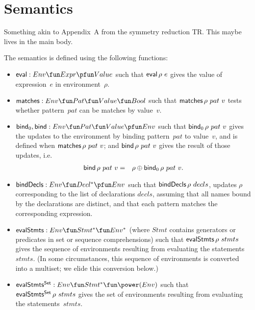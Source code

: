 \section{Semantics}
\label{sec:semantics}

Something akin to Appendix~A from the symmetry reduction TR.  This maybe lives
in the main body. 

The semantics is defined using the following functions:
%
\begin{itemize}
\item $\eval : Env \fun Expr \pfun Value$ such that $\mathop{\sf eval} \rho~e$ gives the
  value of expression~$e$ in environment~$\rho$.

\item $\matches : Env \fun Pat \fun Value \fun Bool$ such that
  $\mathop{\sf matches} \rho~pat ~ v$ tests whether pattern~$pat$ can be matches by
  value~$v$.

\item $\bind_0, \bind : Env \fun Pat \fun Value \pfun Env$ such that
  $\mathop{\sf bind}\nolimits_0 \rho~pat~v$ gives the updates to the environment by binding
  pattern~$pat$ to value~$v$, and is defined when $\mathop{\sf matches} \rho~ pat~v$; and 
  $\mathop{\sf bind}\nolimits \rho~pat~v$ gives the result of those updates, i.e.
  \begin{eqnarray*}
  \mathop{\sf bind}\nolimits \rho~pat~v & = & \rho \oplus \mathop{\sf bind}\nolimits_0 \rho~pat~v.
  \end{eqnarray*}

\item $\bindDecls : Env \fun Decl^* \pfun Env$ such that
  $\mathop{\sf bindDecls} \rho~decls$, updates $\rho$ corresponding to the list of
  declarations $decls$, assuming that all names bound by the declarations are
  distinct, and that each pattern matches the corresponding expression.

\item $\evalStmts : Env \fun Stmt^* \fun Env^*$ (where $Stmt$ contains
  generators or predicates in set or sequence comprehensions) such that
  $\mathop{\sf evalStmts} \rho~stmts$ gives the sequence of environments resulting from
  evaluating the statements~$stmts$.  (In some circumstances, this sequence of
  environments is converted into a multiset; we elide this conversion
  below.)

\item $\evalStmtsSet : Env \fun Stmt^* \fun \power(Env)$ such that
  $\mathop{\sf evalStmts^{Set}} \rho~stmts$ gives the set of environments resulting from
  evaluating the statements~$stmts$.
\end{itemize}

